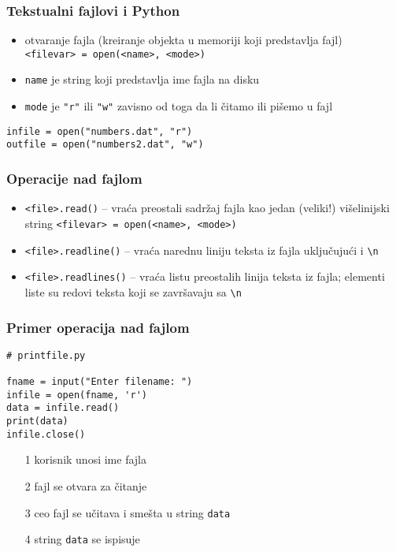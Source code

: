 \documentclass[utf8,compress,aspectratio=169]{beamer}
\begin{document}
\begin{frame}[fragile]
  \frametitle{Tekstualni fajlovi i Python}
  \begin{itemize}
    \item otvaranje fajla (kreiranje objekta u memoriji koji predstavlja fajl) \\
      \texttt{<filevar> = open(<name>, <mode>)}
    \item \texttt{name} je string koji predstavlja ime fajla na disku
    \item \texttt{mode} je \texttt{"r"} ili \texttt{"w"} zavisno od toga da li čitamo ili pišemo u fajl
  \end{itemize}
\begin{verbatim}
infile = open("numbers.dat", "r")
outfile = open("numbers2.dat", "w")
\end{verbatim}
\end{frame}

\begin{frame}[fragile]
  \frametitle{Operacije nad fajlom}
  \begin{itemize}
    \item \texttt{<file>.read()} -- vraća preostali sadržaj fajla kao jedan (veliki!) višelinijski string
      \texttt{<filevar> = open(<name>, <mode>)}
    \item \texttt{<file>.readline()} -- vraća narednu liniju teksta iz fajla uključujući i \texttt{\textbackslash n}
    \item \texttt{<file>.readlines()} -- vraća listu preostalih linija teksta iz fajla; elementi liste su redovi teksta koji se završavaju sa \texttt{\textbackslash n}
  \end{itemize}
\end{frame}

\begin{frame}[fragile]
  \frametitle{Primer operacija nad fajlom}
\begin{verbatim}
# printfile.py

fname = input("Enter filename: ")
infile = open(fname, 'r')
data = infile.read()
print(data)
infile.close()
\end{verbatim}
  \begin{itemize}
    \item[1] korisnik unosi ime fajla
    \item[2] fajl se otvara za čitanje
    \item[3] ceo fajl se učitava i smešta u string \texttt{data}
    \item[4] string \texttt{data} se ispisuje
  \end{itemize}
\end{frame}
\end{document}
